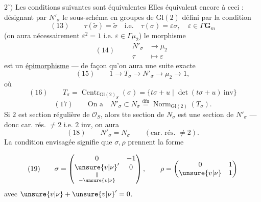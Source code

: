 $2^\circ)$ Les conditions suivantes sont équivalentes
\diagram{\[
(12)\quad\left\{
\begin{tikzcd}[ampersand replacement=\&,column sep=large,row sep=large]
\boxed{\operatorname{Tr}\sigma=0}\arrow[r,Leftrightarrow]\arrow[d,Leftrightarrow]\&\operatorname{Tr}\rho=1\arrow[r,Leftrightarrow]\arrow[d,Leftrightarrow]\&\boxed{\widetilde\sigma^2=1}\arrow[d,Leftrightarrow]\\
\deleted{\mathrm{Tr}}\boxed{\unsure{w|\omega}'=0}\&\boxed{\unsure{w|\omega}=1}\&\sigma^2\in\Gamma\mathbf G_m\arrow[d,Leftrightarrow]\\
\&\&\boxed{\sigma^2=\unsure{v|\nu}\,\mathrm{id}.}
\end{tikzcd}\right.
\]}
Elles équivalent encore à ceci : désignant par $N'_\sigma$ le sous-schéma en groupes de $\mathrm{Gl}(2)$ défini par la condition
\[
(13)\qquad \tau(\widetilde\sigma)=\widetilde\sigma\quad\text{i.e.}\quad\tau(\sigma)=\varepsilon\sigma,\quad\varepsilon\in\Gamma\mathbf G_m
\]
(on aura nécessairement $\varepsilon^2=1$ i.e. $\varepsilon\in\Gamma\mu_2$)
le morphisme
\[
(14)\qquad\begin{aligned}N'_\sigma&\longrightarrow\mu_2\\\tau&\longmapsto\varepsilon\end{aligned}
\]
est un \uline{épimorphisme} --- de façon qu'on aura une suite exacte
\[
(15)\qquad1\longrightarrow T_\sigma\longrightarrow N'_\sigma\longrightarrow\mu_2\longrightarrow1,
\]
où 
\[
(16)\qquad T_\sigma=\operatorname{Centr}_{\mathrm{Gl}(2)_S}(\sigma)=\{t\sigma+u\mid\det(t\sigma+u)\ \text{inv}\}
\]
\[
(17)\qquad\text{On a}\quad N'_\sigma\subset N_\sigma\overset{\mathrm{dfn}}=\operatorname{Norm}_{\mathrm{Gl}(2)}(T_\sigma).
\]
Si $2$ est section régulière de $\mathcal O_S$, alors tte section de $N_\sigma$  est une section de $N'_\sigma$ --- donc   car. rés.  $\ne2$ i.e. $2$ inv, on aura
\[
(18)\qquad N'_\sigma=N_\sigma\qquad(\text{car. rés. }\ne2).
\]
La condition envisagée signifie que $\sigma,\rho$ prennent la forme

\[
(19)\qquad\sigma=\begin{pmatrix}0&-1\\\underset{\substack{\Vert\\-\unsure{v|\nu}}}{\unsure{v|\nu}'}&0\end{pmatrix},\qquad\rho=\begin{pmatrix}0&1\\\unsure{v|\nu}&1\end{pmatrix}
\]
avec $\unsure{v|\nu}+\unsure{v|\nu}'=0$.

